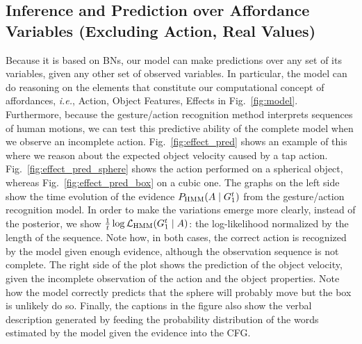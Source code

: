 \subsection{Inference and Prediction over Affordance Variables (Excluding Action, Real Values)}

Because it is based on \aclp{BN}, our model can make predictions over any set of its variables, given any other set of observed variables.
In particular, the model can do reasoning on the elements that constitute our computational concept of affordances, \textit{i.e.}, Action, Object Features, Effects in Fig.~\ref{fig:model}.
Furthermore, because the gesture/action recognition method interprets sequences of human motions, we can test this predictive ability of the complete model when we observe an incomplete action.
Fig.~\ref{fig:effect_pred} shows an example of this where we reason about the expected object velocity caused by a tap action.
Fig.~\ref{fig:effect_pred_sphere} shows the action performed on a spherical object, whereas Fig.~\ref{fig:effect_pred_box} on a cubic one.
The graphs on the left side show the time evolution of the evidence $P_{\text{HMM}}(A \mid G_1^t)$ from the gesture/action recognition model.
In order to make the variations emerge more clearly, instead of the posterior, we show $\frac{1}{t}\log\mathcal{L}_\text{HMM}(G_1^t \mid A)$: the log-likelihood normalized by the length of the sequence.
Note how, in both cases, the correct action is recognized by the model given enough evidence, although the observation sequence is not complete.
The right side of the plot shows the prediction of the object velocity, given the incomplete observation of the action and the object properties.
Note how the model correctly predicts that the sphere will probably move but the box is unlikely do so.
Finally, the captions in the figure also show the verbal description generated by feeding the probability distribution of the words estimated by the model given the evidence into the \acl{CFG}.



